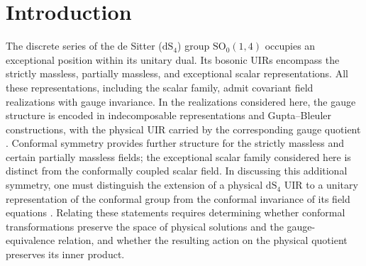 \documentclass{SciPost}
\begin{document}
\vspace{\baselineskip}


\noindent\textcolor{white!90!black}{%
}




\section{Introduction}
\label{sec:intro}

The discrete series of the de Sitter ($\mathrm{dS}_{4}$) group $\mathrm{SO}_0(1,4)$ occupies an exceptional position within its unitary dual. Its bosonic UIRs encompass the strictly massless, partially massless, and exceptional scalar representations. All these representations, including the scalar family, admit covariant field realizations with gauge invariance. In the realizations considered here, the gauge structure is encoded in indecomposable representations and Gupta--Bleuler constructions, with the physical UIR carried by the corresponding gauge quotient \cite{Dixmier, Takahashi, Gazeau2000, takVec, GravGB, GravPartially, Gazeau2024, Bajalan2026, bajalan2026araki, Gazeau2026, Gazeau2025}. Conformal symmetry provides further structure for the strictly massless and certain partially massless fields; the exceptional scalar family considered here is distinct from the conformally coupled scalar field. In discussing this additional symmetry, one must distinguish the extension of a physical $\mathrm{dS}_{4}$ UIR to a unitary representation of the conformal group from the conformal invariance of its field equations \cite{Barut, Todorov, Mack, Gazeau2026, Gazeau2025, DeserWaldron2004}. Relating these statements requires determining whether conformal transformations preserve the space of physical solutions and the gauge-equivalence relation, and whether the resulting action on the physical quotient preserves its inner product.
\end{document}
